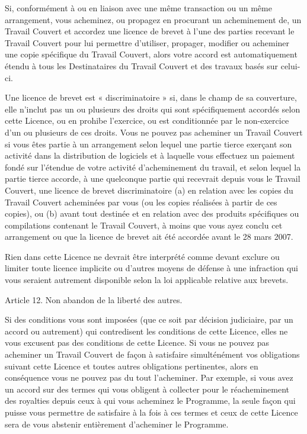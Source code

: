 {Si, conformément à ou en liaison avec une même transaction ou un même
arrangement, vous acheminez, ou propagez en procurant un acheminement
de, un Travail Couvert et accordez une licence de brevet à l’une des
parties recevant le Travail Couvert pour lui permettre d’utiliser,
propager, modifier ou acheminer une copie spécifique du Travail
Couvert, alors votre accord est automatiquement étendu à tous les
Destinataires du Travail Couvert et des travaux basés sur celui-ci.

Une licence de brevet est « discriminatoire » si, dans le champ de sa
couverture, elle n’inclut pas un ou plusieurs des droits qui sont
spécifiquement accordés selon cette Licence, ou en prohibe l’exercice,
ou est conditionnée par le non-exercice d’un ou plusieurs de ces
droits. Vous ne pouvez pas acheminer un Travail Couvert si vous êtes
partie à un arrangement selon lequel une partie tierce exerçant son
activité dans la distribution de logiciels et à laquelle vous effectuez
un paiement fondé sur l’étendue de votre activité d’acheminement du
travail, et selon lequel la partie tierce accorde, à une quelconque
partie qui recevrait depuis vous le Travail Couvert, une licence de
brevet discriminatoire (a) en relation avec les copies du Travail
Couvert acheminées par vous (ou les copies réalisées à partir de ces
copies), ou (b) avant tout destinée et en relation avec des produits
spécifiques ou compilations contenant le Travail Couvert, à moins que
vous ayez conclu cet arrangement ou que la licence de brevet ait été
accordée avant le 28 mars 2007.

Rien dans cette Licence ne devrait être interprété comme devant exclure
ou limiter toute licence implicite ou d’autres moyens de défense à une
infraction qui vous seraient autrement disponible selon la loi
applicable relative aux brevets.


Article 12. Non abandon de la liberté des autres.

Si des conditions vous sont imposées (que ce soit par décision
judiciaire, par un accord ou autrement) qui contredisent les conditions
de cette Licence, elles ne vous excusent pas des conditions de cette
Licence. Si vous ne pouvez pas acheminer un Travail Couvert de façon à
satisfaire simulténément vos obligations suivant cette Licence et
toutes autres obligations pertinentes, alors en conséquence vous ne
pouvez pas du tout l’acheminer. Par exemple, si vous avez un accord sur
des termes qui vous obligent à collecter pour le réacheminement des
royalties depuis ceux à qui vous acheminez le Programme, la seule façon
qui puisse vous permettre de satisfaire à la fois à ces termes et ceux
de cette Licence sera de vous abstenir entièrement d’acheminer le
Programme.


}
